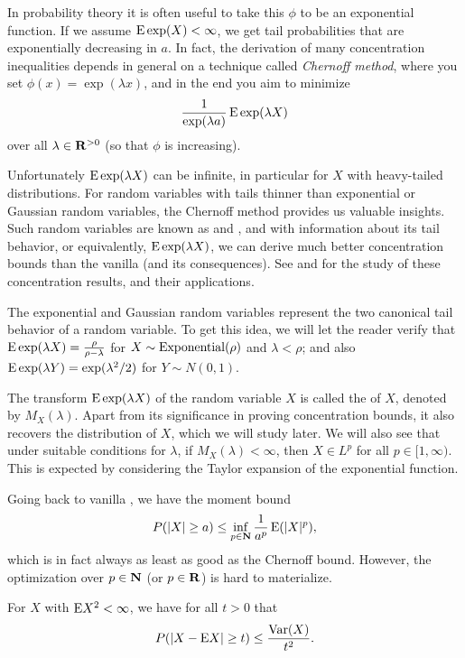 In probability theory it is often useful to take this $\phi$ to be an exponential function. If we assume $\mathop{}\!\mathrm{E} \exp(X) < \infty$, we get tail probabilities that are exponentially decreasing in $a$. In fact, the derivation of many concentration inequalities depends in general on a technique called \emph{Chernoff method}, where you set $\phi(x) = \exp(\lambda x)$, and in the end you aim to minimize \[\frac{1}{\exp(\lambda a)}\mathop{}\!\mathrm{E} \exp(\lambda X) \] over all $\lambda \in \mathbf{R}^{>0}$ (so that $\phi$ is increasing).

Unfortunately $\mathop{}\!\mathrm{E} \exp(\lambda X)$ can be infinite, in particular for $X$ with heavy-tailed distributions. For random variables with tails thinner than exponential or Gaussian random variables, the Chernoff method provides us valuable insights. Such random variables are known as  and , and with information about its tail behavior, or equivalently, $\mathop{}\!\mathrm{E} \exp(\lambda X)$, we can derive much better concentration bounds than the vanilla  (and its consequences). See \cite{Vershynin_2018} and \cite{Handel2014HDP} for the study of these concentration results, and their applications.

The exponential and Gaussian random variables represent the two canonical tail behavior of a random variable. To get this idea, we will let the reader verify that $\mathop{}\!\mathrm{E} \exp(\lambda X) = \frac{\rho}{\rho - \lambda}$ for $X \sim \operatorname{Exponential}(\rho)$ and $\lambda < \rho$; and also $\mathop{}\!\mathrm{E}\exp(\lambda Y) = \exp(\lambda^2 / 2)$ for $Y \sim N(0,1)$.

The transform $\mathop{}\!\mathrm{E}\exp(\lambda X)$ of the random variable $X$ is called the  of $X$, denoted by $M_X(\lambda)$. Apart from its significance in proving concentration bounds, it also recovers the distribution of $X$, which we will study later. We will also see that under suitable conditions for $\lambda$, if $M_X(\lambda) < \infty$, then $X \in L^p$ for all $p \in [1,\infty)$. This is expected by considering the Taylor expansion of the exponential function. 

Going back to vanilla , we have the moment bound \[
    P(\lvert X \rvert \geq a) \leq \inf_{p\in \mathbf{N}} \frac{1}{a^p} \mathop{}\!\mathrm{E}(\lvert X \rvert^p),
\] which is in fact always as least as good as the Chernoff bound. However, the optimization over $p\in \mathbf{N}$ (or $p \in \mathbf{R}$) is hard to materialize.

\begin{namedthm} \label{thm:Chebyshev-ineq}
    For $X$ with $\mathop{}\!\mathrm{E} X^2 < \infty$, we have for all $t > 0$ that \[
        P(\lvert X - \mathop{}\!\mathrm{E} X \rvert \geq t) \leq \frac{\operatorname{Var}(X)}{t^2}.
    \]
\end{namedthm}

